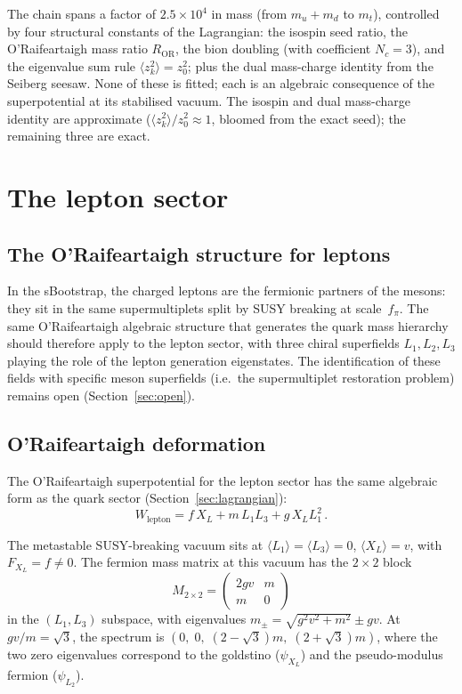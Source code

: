 \documentclass[12pt,a4paper]{article}
\newcommand{\fpi}{f_\pi}
\begin{document}
The chain spans a factor of $2.5 \times 10^4$ in mass
(from $m_u + m_d$ to $m_t$),
controlled by four structural constants of the Lagrangian: the
isospin seed ratio, the
O'Raifeartaigh mass ratio $R_{\mathrm{OR}}$, the bion doubling
(with coefficient $N_c = 3$), and the eigenvalue sum rule
$\langle z_k^2\rangle = z_0^2$; plus the dual mass-charge identity from
the Seiberg seesaw. None of these is fitted; each is an algebraic
consequence of the superpotential at its stabilised vacuum.
The isospin and dual mass-charge identity are approximate
($\langle z_k^2\rangle/z_0^2 \approx 1$, bloomed from the exact
seed); the remaining three are exact.


\section{The lepton sector}
\label{sec:leptons}

\subsection{The O'Raifeartaigh structure for leptons}

In the sBootstrap, the charged leptons are the fermionic partners
of the mesons: they sit in the same supermultiplets split by
SUSY breaking at scale~$\fpi$.  The same O'Raifeartaigh
algebraic structure that generates the quark mass hierarchy
should therefore apply to the lepton sector, with three chiral
superfields $L_1, L_2, L_3$ playing the role of the lepton
generation eigenstates.  The identification of these fields
with specific meson superfields (i.e.\ the supermultiplet
restoration problem) remains open
(Section~\ref{sec:open}).

\subsection{O'Raifeartaigh deformation}

The O'Raifeartaigh superpotential for the lepton sector has
the same algebraic form as the quark sector
(Section~\ref{sec:lagrangian}):
\begin{equation}
W_{\text{lepton}} = f\, X_L + m\, L_1 L_3 + g\, X_L L_1^2\,.
\end{equation}

The metastable SUSY-breaking vacuum sits at
$\langle L_1\rangle = \langle L_3\rangle = 0$,
$\langle X_L\rangle = v$, with $F_{X_L} = f \neq 0$.
The fermion mass matrix at this vacuum has the $2\times 2$ block
\begin{equation}
M_{2\times 2} = \begin{pmatrix} 2gv & m \\ m & 0 \end{pmatrix}
\end{equation}
in the $(L_1, L_3)$ subspace, with eigenvalues
$m_\pm = \sqrt{g^2v^2 + m^2} \pm gv$.
At $gv/m = \sqrt{3}$, the spectrum is
$(0,\; 0,\; (2-\sqrt{3})m,\; (2+\sqrt{3})m)$,
where the two zero eigenvalues correspond to the goldstino ($\psi_{X_L}$)
and the pseudo-modulus fermion ($\psi_{L_2}$).
\end{document}
